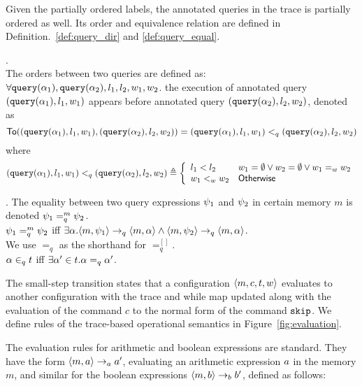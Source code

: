 \documentclass[a4paper,11pt]{article}
\begin{document}
Given the partially ordered labels, the annotated queries in the trace is partially ordered as well. Its order and equivalence relation are defined in Definition.~\ref{def:query_dir} and \ref{def:query_equal}.
%
\begin{defn}.
\label{def:query_dir}
\\
The orders between two queries are defined as:
{
$\forall {\tt query}(\alpha_1), {\tt query}(\alpha_2), l_1, l_2, w_1, w_2 $.
the execution of annotated query $( {\tt query}(\alpha_1), l_1, w_1)$ appears before annotated query $( {\tt query}(\alpha_2), l_2, w_2)$, denoted as
%
\[
\mathsf{To}(({\tt query}(\alpha_1), l_1, w_1), ( {\tt query}(\alpha_2), l_2, w_2))
= 
({\tt query}(\alpha_1), l_1, w_1) 
<_q ( {\tt query}(\alpha_2), l_2, w_2)
\]
where \\
\[
(\query(\qval_1), l_1, w_1) 
<_q ( \query(\qval_2), l_2, w_2)
 \triangleq 
 \left\{
 \begin{array}{ll}
    l_1 < l_2  
    & w_1=\emptyset \lor w_2 = \emptyset \lor w_1 =_w w_2
    \\
    w_1 <_w w_2
    & \mathsf{Otherwise}
\end{array}  
\right.
\]
}
\end{defn}

%
\begin{defn}.
\label{def:query_equal}
 The equality between two query expressions $\psi_1$ and $\psi_2$ in certain memory $m$ is denoted  $ \psi_1 =_{q}^{m} \psi_2$.\\
$\psi_1 =_{q}^{m} \psi_2$ iff $ \exists \alpha. \langle m,  \psi_1 \rangle \rightarrow_q \langle m, \alpha \rangle \land \langle m,  \psi_2  \rangle \rightarrow_q \langle m, \alpha \rangle $. \\
We use $=_{q}$ as the shorthand for $=_{q}^{[]}$.\\
$\alpha \in_q t $ iff $\exists \alpha' \in t. \alpha =_q \alpha'$.
\end{defn}

The small-step transition states that a configuration $\langle m, c, t,w \rangle$ evaluates to another configuration with the trace and while map updated along with the evaluation of the command $c$ to the normal form of the command $\mathtt{skip}$.  
We define rules of the trace-based operational semantics in Figure~\ref{fig:evaluation}.
%

%
The evaluation rules for arithmetic and boolean expressions are standard. 
They have the form $\langle m,a \rangle \rightarrow_a a' $, evaluating an arithmetic expression $a$ in the memory $m$, and similar for the boolean expressions $\langle m, b \rangle \rightarrow_b b'$, defined as follows:
	\begin{mathpar}
	\\
	\\
	\end{mathpar}
\end{document}
